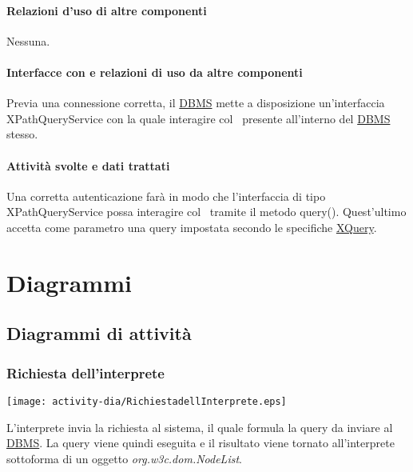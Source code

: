 \subsubsection{Relazioni d'uso di altre componenti}
Nessuna.
\subsubsection{Interfacce con e relazioni di uso da altre componenti}
Previa una connessione corretta, il \underline{DBMS} mette a disposizione un'interfaccia XPathQueryService con la quale interagire col \rp\ presente all'interno del \underline{DBMS} stesso.
\subsubsection{Attivit\`a svolte e dati trattati}
Una corretta autenticazione far\`a in modo che l'interfaccia di tipo XPathQueryService possa interagire col \rp\ tramite il metodo query(). Quest'ultimo accetta come parametro una query impostata secondo le specifiche \underline{XQuery}.

\chapter{Diagrammi}
\section{Diagrammi di attivit\`a}

\subsection{Richiesta dell'interprete}
\begin{center}
 \texttt{[image: activity-dia/RichiestadellInterprete.eps]}
\end{center}
L'interprete invia la richiesta al sistema, il quale formula la query da inviare al \underline{DBMS}. La query viene quindi eseguita e il risultato viene tornato all'interprete sottoforma di un oggetto \textit{org.w3c.dom.NodeList}.

